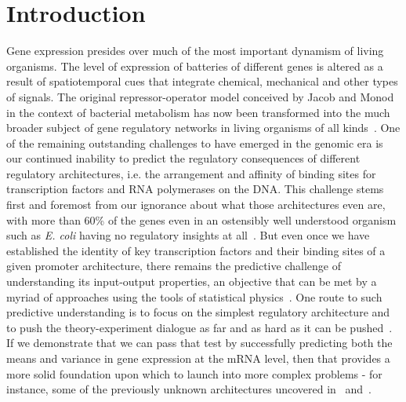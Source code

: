 \section{Introduction}

Gene expression presides over much of the most important dynamism of living
organisms. The level of expression of batteries of different genes is altered as
a result of spatiotemporal cues that integrate chemical, mechanical and other
types of signals. The original repressor-operator model conceived by Jacob and
Monod in the context of bacterial metabolism has now been transformed into the
much broader subject of gene regulatory networks in living organisms of all
kinds~\cite{Jacob1961, Britten1969, Ben-TabouDe-Leon2007}. One of the remaining
outstanding challenges to have emerged in the genomic era is our continued
inability to predict the regulatory consequences of different regulatory
architectures, i.e. the arrangement and affinity of binding sites for
transcription factors and RNA polymerases on the DNA. This challenge stems first
and foremost from our ignorance about what those architectures even are, with
more than 60\% of the genes even in an ostensibly well understood organism such
as {\it E. coli} having no regulatory insights at all~\cite{Rydenfelt2014-2,
Belliveau2018, Ghatak2019, Santos_Zavaleta2019}. But even once we have
established the identity of key transcription factors and their binding sites of
a given promoter architecture, there remains the predictive challenge of
understanding its input-output properties, an objective that can be met by a
myriad of approaches using the tools of statistical physics~\cite{Ackers1982,
Shea1985, Buchler2003, Vilar2003a, Vilar2003b, Bintu2005a, Bintu2005c,
Gertz2009, Sherman2012, Saiz2013, Ko1991, Peccoud1995, Record1996, Kepler2001,
Sanchez2008, Shahrezaei2008, Sanchez2011, Michel2010}. One route to such
predictive understanding is to focus on the simplest regulatory architecture and
to push the theory-experiment dialogue as far and as hard as it can be
pushed~\cite{Garcia2011, Phillips2019}. If we demonstrate that we can pass that
test by successfully predicting both the means and variance in gene expression
at the mRNA level,
then that provides a more solid foundation upon which to launch into more
complex problems - for instance, some of the previously unknown architectures
uncovered in~\cite{Belliveau2018} and~\cite{Ireland2020}.

